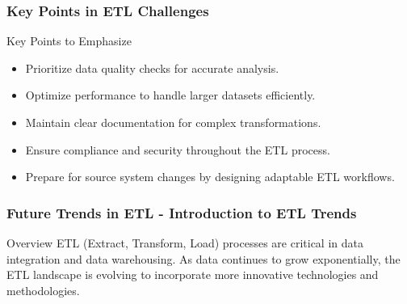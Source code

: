 \documentclass[aspectratio=169]{beamer}
\begin{document}
\begin{frame}[fragile]
    \frametitle{Key Points in ETL Challenges}
    \begin{block}{Key Points to Emphasize}
        \begin{itemize}
            \item Prioritize data quality checks for accurate analysis.
            \item Optimize performance to handle larger datasets efficiently.
            \item Maintain clear documentation for complex transformations.
            \item Ensure compliance and security throughout the ETL process.
            \item Prepare for source system changes by designing adaptable ETL workflows.
        \end{itemize}
    \end{block}
\end{frame}

\begin{frame}[fragile]
    \frametitle{Future Trends in ETL - Introduction to ETL Trends}
    \begin{block}{Overview}
        ETL (Extract, Transform, Load) processes are critical in data integration and data warehousing. 
        As data continues to grow exponentially, the ETL landscape is evolving to incorporate more innovative technologies and methodologies.
    \end{block}
\end{frame}
\end{document}

